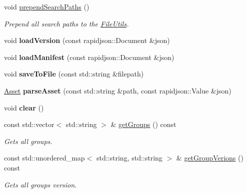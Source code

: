\begin{DoxyCompactItemize}
\mbox{\label{classManifest_a44b5dff7463dac6a8106acbf8fb5871d}} 
void \hyperlink{classManifest_a44b5dff7463dac6a8106acbf8fb5871d}{prepend\+Search\+Paths} ()
\begin{DoxyCompactList}\small\item\em Prepend all search paths to the \hyperlink{classFileUtils}{File\+Utils}. \end{DoxyCompactList}\item 
\mbox{\label{classManifest_a92cb73198cdbcc2f128a6af28fad14b3}} 
void {\bfseries load\+Version} (const rapidjson\+::\+Document \&json)
\item 
\mbox{\label{classManifest_a10bd4096d9108f68caee8f09928ec822}} 
void {\bfseries load\+Manifest} (const rapidjson\+::\+Document \&json)
\item 
\mbox{\label{classManifest_aaf3349d213ada59351f327b597f186f4}} 
void {\bfseries save\+To\+File} (const std\+::string \&filepath)
\item 
\mbox{\label{classManifest_a18839ba62a2f5aa646744496103c9b84}} 
\hyperlink{structManifest_1_1Asset}{Asset} {\bfseries parse\+Asset} (const std\+::string \&path, const rapidjson\+::\+Value \&json)
\item 
\mbox{\label{classManifest_ac23c68d833be7957ed19e16bf874bfc4}} 
void {\bfseries clear} ()
\item 
\mbox{\label{classManifest_a9c498cfae0b6254f654952c7a450fcea}} 
const std\+::vector$<$ std\+::string $>$ \& \hyperlink{classManifest_a9c498cfae0b6254f654952c7a450fcea}{get\+Groups} () const
\begin{DoxyCompactList}\small\item\em Gets all groups. \end{DoxyCompactList}\item 
\mbox{\label{classManifest_a692335459caf1ecb5eca1220f6b6f2c7}} 
const std\+::unordered\+\_\+map$<$ std\+::string, std\+::string $>$ \& \hyperlink{classManifest_a692335459caf1ecb5eca1220f6b6f2c7}{get\+Group\+Verions} () const
\begin{DoxyCompactList}\small\item\em Gets all groups version. \end{DoxyCompactList}\item 

\end{DoxyCompactItemize}
